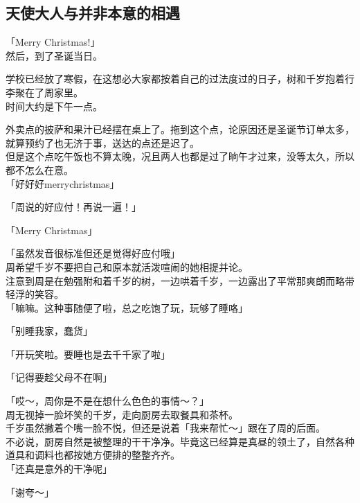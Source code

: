\subsection{天使大人与并非本意的相遇}

「Merry Christmas!」\\

然后，到了圣诞当日。

学校已经放了寒假，在这想必大家都按着自己的过法度过的日子，树和千岁抱着行李聚在了周家里。\\

时间大约是下午一点。

外卖点的披萨和果汁已经摆在桌上了。拖到这个点，论原因还是圣诞节订单太多，就算预约了也无济于事，送达的点还是迟了。\\

但是这个点吃午饭也不算太晚，况且两人也都是过了晌午才过来，没等太久，所以都不怎么在意。\\

「好好好merrychristmas」

「周说的好应付！再说一遍！」

「Merry Christmas」

「虽然发音很标准但还是觉得好应付哦」\\

周希望千岁不要把自己和原本就活泼喧闹的她相提并论。\\

注意到周是在勉强附和着千岁的树，一边哄着千岁，一边露出了平常那爽朗而略带轻浮的笑容。\\

「嘛嘛。这种事随便了啦，总之吃饱了玩，玩够了睡咯」

「别睡我家，蠢货」

「开玩笑啦。要睡也是去千千家了啦」

「记得要趁父母不在啊」

「哎～，周你是不是在想什么色色的事情～？」\\

周无视掉一脸坏笑的千岁，走向厨房去取餐具和茶杯。\\

千岁虽然撇着个嘴一脸不悦，但还是说着「我来帮忙～」跟在了周的后面。\\

不必说，厨房自然是被整理的干干净净。毕竟这已经算是真昼的领土了，自然各种道具和调料也都按她方便排的整整齐齐。\\

「还真是意外的干净呢」

「谢夸～」\\

